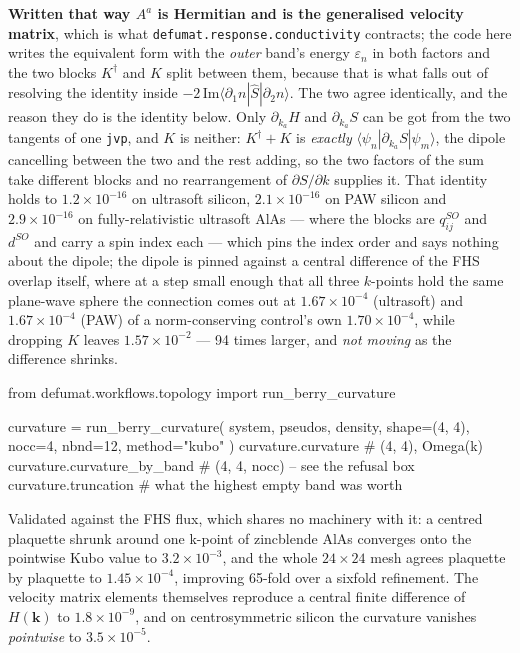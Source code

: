 \documentclass[11pt,a4paper]{article}
\newcommand{\code}[1]{\texttt{\small #1}}
\begin{document}
\textbf{Written that way $A^a$ is Hermitian and is the generalised velocity
matrix}, which is what \code{defumat.response.conductivity} contracts; the code
here writes the equivalent form with the \emph{outer} band's energy
$\varepsilon_n$ in both factors and the two blocks $K^\dagger$ and $K$ split
between them, because that is what falls out of resolving the identity inside
$-2\,\mathrm{Im}\langle\partial_1 n|\hat S|\partial_2 n\rangle$. The two agree
identically, and the reason they do is the identity below. Only
$\partial_{k_a}H$ and $\partial_{k_a}S$ can be got from
the two tangents of one \code{jvp}, and $K$ is neither: $K^\dagger + K$ is
\emph{exactly} $\langle\psi_n|\partial_{k_a}S|\psi_m\rangle$, the dipole
cancelling between the two and the rest adding, so the two factors of the sum
take different blocks and no rearrangement of $\partial S/\partial k$ supplies
it. That identity holds to $1.2\times10^{-16}$ on ultrasoft silicon,
$2.1\times10^{-16}$ on PAW silicon and $2.9\times10^{-16}$ on
fully-relativistic ultrasoft AlAs --- where the blocks are $q^{SO}_{ij}$ and
$d^{SO}$ and carry a spin index each --- which pins the index order and says
nothing about the dipole; the dipole is pinned against a central difference of the FHS
overlap itself, where at a step small enough that all three $k$-points hold the
same plane-wave sphere the connection comes out at
$1.67\times10^{-4}$ (ultrasoft) and $1.67\times10^{-4}$ (PAW) of a
norm-conserving control's own $1.70\times10^{-4}$, while dropping $K$ leaves
$1.57\times10^{-2}$ --- 94 times larger, and \emph{not moving} as the difference
shrinks.

\begin{pycode}
from defumat.workflows.topology import run_berry_curvature

curvature = run_berry_curvature(
    system, pseudos, density, shape=(4, 4), nocc=4, nbnd=12, method="kubo"
)
curvature.curvature          # (4, 4), Omega(k)
curvature.curvature_by_band  # (4, 4, nocc) -- see the refusal box
curvature.truncation         # what the highest empty band was worth
\end{pycode}

Validated against the FHS flux, which shares no machinery with it: a centred
plaquette shrunk around one k-point of zincblende AlAs converges onto the
pointwise Kubo value to $3.2\times10^{-3}$, and the whole $24\times24$ mesh
agrees plaquette by plaquette to $1.45\times10^{-4}$, improving 65-fold over a
sixfold refinement. The velocity matrix elements themselves reproduce a central
finite difference of $H(\mathbf k)$ to $1.8\times10^{-9}$, and on centrosymmetric
silicon the curvature vanishes \emph{pointwise} to $3.5\times10^{-5}$.
\end{document}
